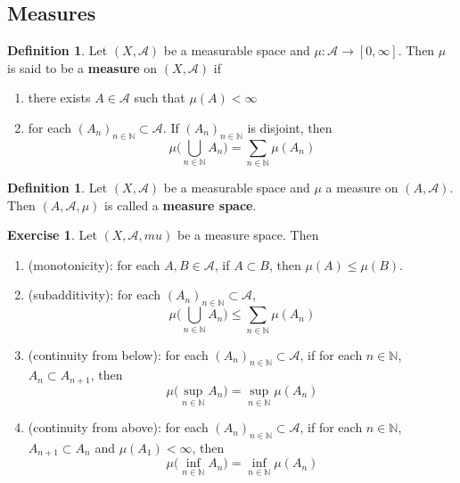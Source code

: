 \documentclass[12pt]{amsart}
\theoremstyle{definition}
\newtheorem{defn}[definition]{Definition}
\newtheorem{ex}[definition]{Exercise}
\newcommand{\N}{\mathbb{N}}
\newcommand{\MA}{\mathcal{A}}
\newcommand{\RG}{[0,\infty]}
\begin{document}
	
	
	
	
	
	
	
	
	
	
	
	
	
	
	
	
	\subsection{Measures}
	
	\begin{defn}
		Let $(X, \MA)$ be a measurable space and $\mu:\MA \rightarrow \RG$. Then $\mu$ is said to be a \textbf{measure} on $(X, \MA)$ if 
		\begin{enumerate}
			\item there exists $A \in \MA$ such that $\mu(A)< \infty$
			\item for each $(A_n)_{n \in \N} \subset \MA$. If $(A_n)_{n \in \N}$ is disjoint, then $$\mu\bigg(\bigcup_{n \in \N}A_n \bigg) = \sum_{n \in \N}\mu(A_n)$$
		\end{enumerate}
	\end{defn}
	
	\begin{defn}
		Let $(X,\MA)$ be a measurable space and $\mu$ a measure on $(A, \MA)$. Then $(A, \MA, \mu)$ is called a \textbf{measure space}. 
	\end{defn}
	
	\begin{ex}
		Let $(X, \MA, mu)$ be a measure space. Then 
		\begin{enumerate}
			\item (monotonicity): for each $A,B \in \MA$, if $A \subset B$, then $\mu(A) \leq \mu(B)$.
			\item (subadditivity): for each $(A_n)_{n \in \N} \subset \MA$, $$\mu \bigg( \bigcup_{n \in \N} A_n \bigg) \leq \sum_{n \in \N}\mu(A_n)$$
			\item (continuity from below): for each $(A_n)_{n \in \N} \subset \MA$, if for each $n \in \N$, $A_n \subset A_{n+1}$, then $$\mu\bigg(\sup_{n \in \N} A_n\bigg) = \sup_{n \in \N}\mu(A_n)$$
			\item (continuity from above): for each $(A_n)_{n \in \N} \subset \MA$, if for each $n \in \N$, $ A_{n+1} \subset A_n$ and $\mu(A_1) < \infty$, then $$\mu\bigg(\inf_{n \in \N} A_n\bigg) = \inf_{n \in \N}\mu(A_n)$$
		\end{enumerate}
		
	\end{ex}
	
\end{document}
